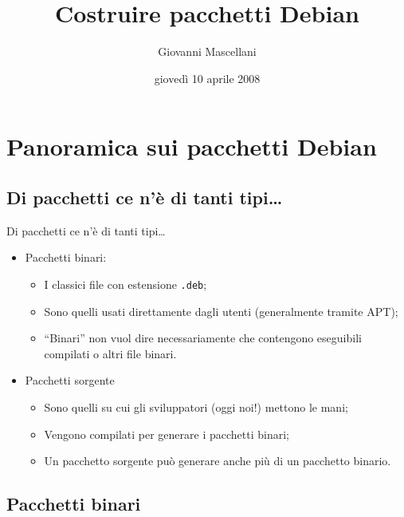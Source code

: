 \documentclass{beamer}
\title{Costruire pacchetti Debian}
\author{Giovanni Mascellani}
\date{giovedì 10 aprile 2008}
\institute{GULP - Gruppo Utenti Linux di Pisa}
\begin{document}
\begin{frame}
\maketitle
\end{frame}

\begin{frame}
\tableofcontents
\end{frame}

\section{Panoramica sui pacchetti Debian}

\begin{frame}
\tableofcontents[currentsection]
\end{frame}

\subsection{Di pacchetti ce n'è di tanti tipi\dots}

\begin{frame}{Di pacchetti ce n'è di tanti tipi\dots}
	\begin{itemize}
	\item Pacchetti binari:
		\begin{itemize}
		\item I classici file con estensione {\tt.deb};
		\item Sono quelli usati direttamente dagli utenti (generalmente tramite APT);
		\item ``Binari'' non vuol dire necessariamente che contengono eseguibili compilati o altri file binari.
		\end{itemize}
	\pause
	\item Pacchetti sorgente
		\begin{itemize}
		\item Sono quelli su cui gli sviluppatori (oggi noi!) mettono le mani;
		\item Vengono compilati per generare i pacchetti binari;
		\item Un pacchetto sorgente può generare anche più di un pacchetto binario.
		\end{itemize}
	\end{itemize}
\end{frame}

\subsection{Pacchetti binari}
\end{document}
